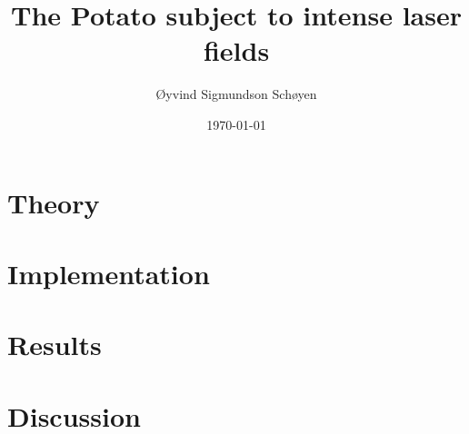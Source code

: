 \documentclass[twoside, english, notitlepage, 12pt]{uiofysmaster}
\author{Øyvind Sigmundson Schøyen}
\title{The Potato subject to intense laser fields}
\date{\today}
\begin{document}
\frontmatter
    \maketitle

    \begin{abstract}
        
    \end{abstract}

    \begin{acknowledgements}
        
    \end{acknowledgements}

    \tableofcontents
    \listoffigures
    \listoftables

\mainmatter

    

    \part{Theory}
        
        

        
        
        

        

        

    \part{Implementation}
    \part{Results}
        
        
    \part{Discussion}
\end{document}
